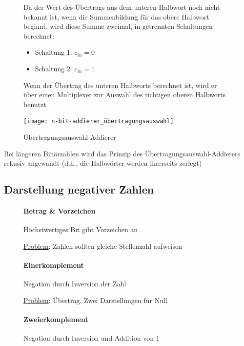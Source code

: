 \documentclass[12pt]{report}
\begin{document}
\begin{figure}[H]
  \begin{minipage}[t]{.45\textwidth}
    Da der Wert des Übertrags aus dem unteren Halbwort noch nicht bekannt ist, wenn die Summenbildung für das obere
    Halbwort beginnt, wird diese Summe zweimal, in getrennten Schaltungen berechnet:
    \begin{itemize}
      \item Schaltung 1: $c_{in} = 0$
      \item Schaltung 2: $c_{in} = 1$
    \end{itemize}
    \par Wenn der Übertrag des unteren Halbworts berechnet ist, wird er über einen 
    Multiplexer zur Auswahl des richtigen oberen Halbworts benutzt
  \end{minipage}
  \hfill
  \begin{minipage}[t]{.45\textwidth}
    \caption{Übertragungsauswahl-Addierer}
    \centering
    \texttt{[image: n-bit-addierer\_übertragungsauswahl]}
  \end{minipage}
\end{figure}

\begin{infobox}
  Bei längeren Binärzahlen wird das Prinzip des Übertragungsauswahl-Addierers rekusiv angewandt (d.h., die Halbwörter werden ihrerseits zerlegt)
\end{infobox}

\subsection{Darstellung negativer Zahlen}
\begin{figure}[H]
  \begin{minipage}[t]{.3\textwidth}
    \centering
    \paragraph{Betrag \& Vorzeichen}
    \small Höchstwertiges Bit gibt Vorzeichen an

    \underline{Problem}: Zahlen sollten gleiche Stellenzahl aufweisen
  \end{minipage}
  \hfill
  \begin{minipage}[t]{.3\textwidth}
    \centering
    \paragraph{Einerkomplement}
    \small Negation durch Inversion der Zahl

    \underline{Problem}: Übertrag, Zwei Darstellungen für Null
  \end{minipage}
  \hfill
  \begin{minipage}[t]{.3\textwidth}
    \centering
    \paragraph{Zweierkomplement}
    \small Negation durch Inversion und Addition von 1
  \end{minipage}
\end{figure}
\end{document}
